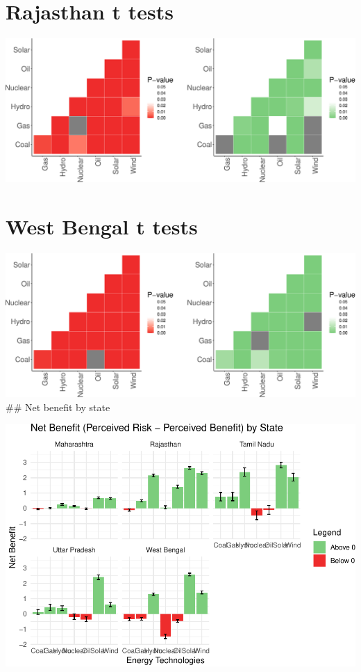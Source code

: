 \documentclass[
]{article}
\begin{document}
\hypertarget{rajasthan-t-tests}{%
\section{Rajasthan t tests}\label{rajasthan-t-tests}}

\includegraphics{nuclear-in-comparison_files/figure-latex/unnamed-chunk-22-1.pdf}

\hypertarget{west-bengal-t-tests}{%
\section{West Bengal t tests}\label{west-bengal-t-tests}}

\includegraphics{nuclear-in-comparison_files/figure-latex/unnamed-chunk-23-1.pdf}
\#\# Net benefit by state

\includegraphics{nuclear-in-comparison_files/figure-latex/unnamed-chunk-25-1.pdf}
\end{document}
